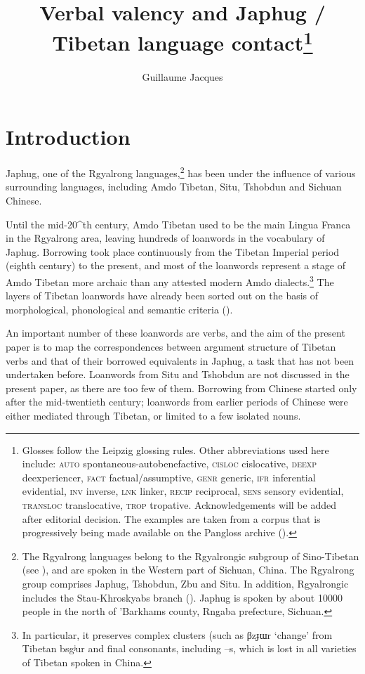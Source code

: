 \documentclass[oldfontcommands,oneside,a4paper,11pt]{article}
\newcommand{\ipa}[1]{{\phon \mbox{#1}}} %
\begin{document}
 
\title{Verbal valency and Japhug / Tibetan language contact\footnote{Glosses follow the Leipzig glossing rules. Other abbreviations used here include: \textsc{auto} spontaneous-autobenefactive, \textsc{cisloc} cislocative,  \textsc{deexp} deexperiencer, \textsc{fact} factual/assumptive, \textsc{genr} generic, \textsc{ifr} inferential evidential,  \textsc{inv} inverse, \textsc{lnk} linker, \textsc{recip} reciprocal, \textsc{sens} sensory  evidential, \textsc{transloc} translocative, \textsc{trop} tropative.  Acknowledgements will be added after editorial decision. The examples are taken from a corpus that is progressively being made available on the Pangloss archive (\citealt{michailovsky14pangloss}). }}
\author{Guillaume Jacques}
\maketitle
\linenumbers


\section{Introduction}
Japhug, one of the Rgyalrong languages,\footnote{The Rgyalrong languages belong to the Rgyalrongic subgroup of Sino-Tibetan (see \citealt{jackson00puxi}), and are spoken in the Western part of Sichuan, China. The Rgyalrong group comprises Japhug, Tshobdun, Zbu and Situ. In addition, Rgyalrongic includes the Stau-Khroskyabs branch (\citealt{lai14person}). Japhug is spoken by about 10000 people in the north of 'Barkhams county, Rngaba prefecture, Sichuan. } has been under the influence of various surrounding languages, including Amdo Tibetan, Situ, Tshobdun and Sichuan Chinese. 

Until the mid-20^{th} century, Amdo Tibetan used to be the main Lingua Franca in the Rgyalrong area, leaving hundreds of loanwords in the vocabulary of Japhug. Borrowing took place continuously from the Tibetan Imperial period (eighth century) to the present, and most of the loanwords represent a stage of Amdo Tibetan more archaic than any attested modern Amdo dialects.\footnote{In particular, it preserves complex clusters (such as \ipa{βzɟɯr} `change' from Tibetan \ipa{bsgʲur} and final consonants, including \ipa{--s}, which is lost in all varieties of Tibetan spoken in China.} The layers of Tibetan loanwords have already been sorted out on the basis of morphological, phonological and semantic criteria (\citealt[83-200]{jacques04these}).

An important number of these loanwords are verbs, and the aim of the present paper is to map the correspondences between argument structure of Tibetan verbs and that of their borrowed equivalents in Japhug, a task that has not been undertaken before. Loanwords from Situ and Tshobdun are not discussed in the present paper, as there are too few of them. Borrowing from Chinese started only after the mid-twentieth century; loanwords from earlier periods of Chinese were either mediated through Tibetan, or limited to a few isolated nouns.
\end{document}
